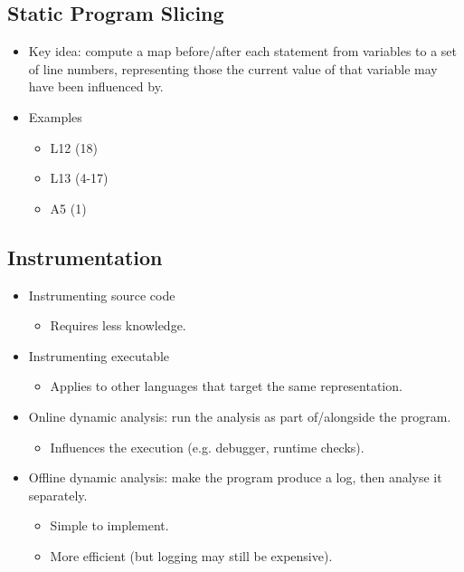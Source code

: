 \documentclass{article}
\begin{document}
\subsection{Static Program Slicing}

\begin{itemize}
    \item Key idea: compute a map before/after each statement from variables to a set of line numbers, representing those the current value of that variable may have been influenced by.
    \item Examples
    \begin{itemize}
        \item L12 (18)
        \item L13 (4-17)
        \item A5 (1)
    \end{itemize}
\end{itemize}

\subsection{Instrumentation}

\begin{itemize}
    \item Instrumenting source code
    \begin{itemize}
        \item Requires less knowledge.
    \end{itemize}
    \item Instrumenting executable
    \begin{itemize}
        \item Applies to other languages that target the same representation.
    \end{itemize}
    \item Online dynamic analysis: run the analysis as part of/alongside the program.
    \begin{itemize}
        \item Influences the execution (e.g. debugger, runtime checks).
    \end{itemize}
    \item Offline dynamic analysis: make the program produce a log, then analyse it separately.
    \begin{itemize}
        \item Simple to implement.
        \item More efficient (but logging may still be expensive).
    \end{itemize}
\end{itemize}
\end{document}
